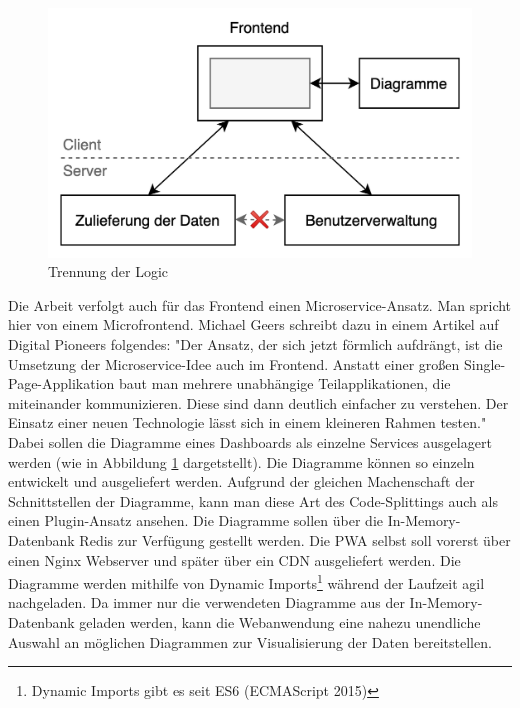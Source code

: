 \begin{figure}
    \begin{center}
    \includegraphics[scale=0.2]{img/abbildungen/TrennungDerLogic}
    \end{center}
    \caption{Trennung der Logic}
    \label{figure:trennungderlogic}
\end{figure}

Die Arbeit verfolgt auch für das Frontend einen Microservice-Ansatz. Man spricht hier von einem
Microfrontend. Michael Geers schreibt dazu in einem Artikel auf Digital Pioneers folgendes:
"Der Ansatz, der sich jetzt förmlich aufdrängt, ist die Umsetzung der Microservice-Idee
auch im Frontend. Anstatt einer ­großen Single-Page-Applikation baut man mehrere unabhängige
Teilapplikationen, die miteinander kommunizieren. Diese sind dann deutlich einfacher zu verstehen.
Der Einsatz einer neuen Technologie lässt sich in einem kleineren Rahmen testen."\cite{MicrofrontendT3N}
Dabei sollen die Diagramme eines Dashboards als einzelne Services ausgelagert werden (wie in Abbildung \ref{figure:trennungderlogic} dargetstellt).
Die Diagramme können so einzeln entwickelt und ausgeliefert werden. Aufgrund der
gleichen Machenschaft der Schnittstellen der Diagramme, kann man diese Art des Code-Splittings auch als
einen Plugin-Ansatz ansehen. Die Diagramme sollen über die In-Memory-Datenbank
Redis zur Verfügung gestellt werden. Die PWA selbst soll vorerst über einen
Nginx Webserver und später über ein CDN ausgeliefert werden. Die Diagramme werden mithilfe
von Dynamic Imports\footnote{Dynamic Imports gibt es seit ES6 (ECMAScript 2015)\cite{DynamicImportsV8}}
während der Laufzeit agil nachgeladen. Da immer nur die verwendeten Diagramme aus der In-Memory-Datenbank
geladen werden, kann die Webanwendung eine nahezu unendliche Auswahl an möglichen Diagrammen zur Visualisierung
der Daten bereitstellen.

